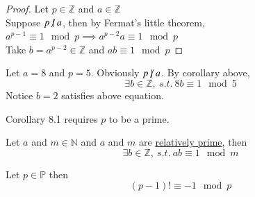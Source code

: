\documentclass[11pt]{article}
\begin{document}
	\begin{proof}
		Let $p \in \mathbb{Z}$ and $a \in \mathbb{Z}$ \\
		Suppose $p \centernot | a$, then by Fermat's little theorem, \\
		$a^{p-1} \equiv 1 \mod p \implies a^{p-2}a \equiv 1 \mod p$ \\
		Take $b = a^{p-2} \in \mathbb{Z}$ and $ab \equiv 1 \mod p$
	\end{proof}
	
	\begin{example}
		Let $a=8$ and $p=5$. Obviously $p \centernot | a$. By corollary above, 
		\[
			\exists b \in \mathbb{Z},\ s.t.\ 8b \equiv 1 \mod 5
		\]
		Notice $b=2$ satisfies above equation.
	\end{example}
	
	\begin{remark}
		Corollary 8.1 requires $p$ to be a prime.
	\end{remark}
	
	\begin{corollary}[Generalization]
		Let $a$ and $m \in \mathbb{N}$ and $a$ and $m$ are \ul{relatively prime}, then 
		\[
			\exists b \in \mathbb{Z},\ s.t.\ ab \equiv 1 \mod m
		\]
	\end{corollary}
	
	\begin{theorem}
		Let $p \in \mathbb{P}$ then
		\[
			(p-1)! \equiv -1 \mod p 
		\]
	\end{theorem}
	
\end{document}
